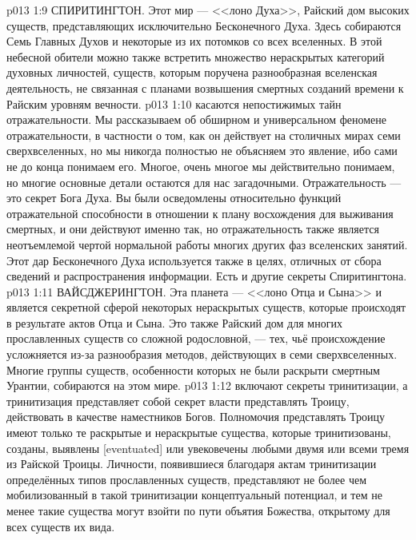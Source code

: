 \vs p013 1:9 СПИРИТИНГТОН. Этот мир --- <<лоно Духа>>, Райский дом высоких существ, представляющих исключительно Бесконечного Духа. Здесь собираются Семь Главных Духов и некоторые из их потомков со всех вселенных. В этой небесной обители можно также встретить множество нераскрытых категорий духовных личностей, существ, которым поручена разнообразная вселенская деятельность, не связанная с планами возвышения смертных созданий времени к Райским уровням вечности.
\vs p013 1:10 \pc {} касаются непостижимых тайн отражательности. Мы рассказываем об обширном и универсальном феномене отражательности, в частности о том, как он действует на столичных мирах семи сверхвселенных, но мы никогда полностью не объясняем это явление, ибо сами не до конца понимаем его. Многое, очень многое мы действительно понимаем, но многие основные детали остаются для нас загадочными. Отражательность --- это секрет Бога Духа. Вы были осведомлены относительно функций отражательной способности в отношении к плану восхождения для выживания смертных, и они действуют именно так, но отражательность также является неотъемлемой чертой нормальной работы многих других фаз вселенских занятий. Этот дар Бесконечного Духа используется также в целях, отличных от сбора сведений и распространения информации. Есть и другие секреты Спиритингтона.
\vs p013 1:11 ВАЙСДЖЕРИНГТОН. Эта планета --- <<лоно Отца и Сына>> и является секретной сферой некоторых нераскрытых существ, которые происходят в результате актов Отца и Сына. Это также Райский дом для многих прославленных существ со сложной родословной, --- тех, чьё происхождение усложняется из\hyp{}за разнообразия методов, действующих в семи сверхвселенных. Многие группы существ, особенности которых не были раскрыти смертным Урантии, собираются на этом мире.
\vs p013 1:12 \pc {} включают секреты тринитизации, а тринитизация представляет собой секрет власти представлять Троицу, действовать в качестве наместников Богов. Полномочия представлять Троицу имеют только те раскрытые и нераскрытые существа, которые тринитизованы, созданы, выявлены [eventuated] или увековечены любыми двумя или всеми тремя из Райской Троицы. Личности, появившиеся благодаря актам тринитизации определённых типов прославленных существ, представляют не более чем мобилизованный в такой тринитизации концептуальный потенциал, и тем не менее такие существа могут взойти по пути объятия Божества, открытому для всех существ их вида.
